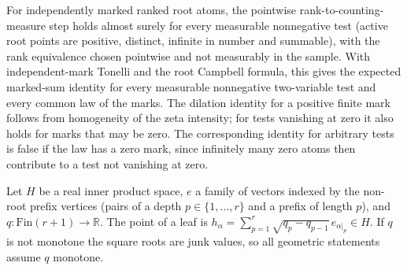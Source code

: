 \begin{lemma}
For independently marked ranked root atoms, the pointwise rank-to-counting-measure
step holds almost surely for every measurable nonnegative test (active root points are positive,
distinct, infinite in number and summable), with the rank equivalence chosen pointwise and not
measurably in the sample. With independent-mark Tonelli and the root Campbell formula,
this gives the expected marked-sum identity for every measurable nonnegative two-variable test
and every common law of the marks. The dilation identity for a positive finite mark follows from
homogeneity of the zeta intensity; for tests vanishing at zero it also holds for marks that
may be zero. The corresponding identity for arbitrary tests is false if the law has a zero mark,
since infinitely many zero atoms then contribute to a test not vanishing at zero.
\end{lemma}

\begin{definition}\label{def:sg:cascade-point}
  \leanok
Let $H$ be a real inner product space, $e$ a family of vectors indexed by the non-root prefix vertices (pairs of a depth $p\in\{1,\dots,r\}$ and a prefix of length $p$), and $q:\mathrm{Fin}(r+1)\to\mathbb R$. The point of a leaf is $h_\alpha=\sum_{p=1}^r\sqrt{q_p-q_{p-1}}\,e_{\alpha|_p}\in H$. If $q$ is not monotone the square roots are junk values, so all geometric statements assume $q$ monotone.
\end{definition}

